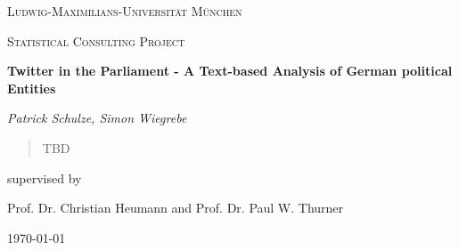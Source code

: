 \documentclass[12pt]{article}
\begin{document}
\begin{titlepage}
	\centering
	{\scshape\LARGE Ludwig-Maximilians-Universit\"at M\"unchen \par}
	\vspace{1cm}
	{\scshape\Large Statistical Consulting Project \par}
	\vspace{1.5cm}
	{\huge\bfseries Twitter in the Parliament - A Text-based Analysis of German political Entities  \par}
	\vspace{2cm}
	{\Large\itshape Patrick Schulze, Simon Wiegrebe \par}
	\vspace{2cm}	
	\begin{abstract}
		\begin{center}
		TBD
		\end{center}		
	\end{abstract}
	\vfill
	supervised by\par
	Prof. Dr. Christian Heumann and Prof. Dr. Paul W. Thurner

	\vfill

	{\large \today\par}
\end{titlepage}

\tableofcontents
\newpage









\newpage

\clearpage



\end{document}
